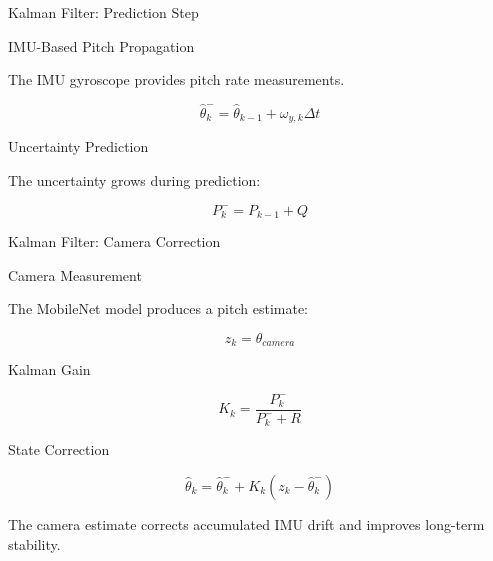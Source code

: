 \documentclass[aspectratio=169,11pt]{beamer}
\begin{document}
\begin{frame}{Kalman Filter: Prediction Step}

\begin{block}{IMU-Based Pitch Propagation}

The IMU gyroscope provides pitch rate measurements.

\[
\hat{\theta}_k^{-}
=
\hat{\theta}_{k-1}
+
\omega_{y,k}\Delta t
\]

\end{block}

\vspace{0.3cm}

\begin{block}{Uncertainty Prediction}

The uncertainty grows during prediction:

\[
P_k^{-}
=
P_{k-1}
+
Q
\]

\end{block}

\end{frame}

\begin{frame}{Kalman Filter: Camera Correction}

\begin{block}{Camera Measurement}

The MobileNet model produces a pitch estimate:

\[
z_k
=
\theta_{camera}
\]

\end{block}

\vspace{0.3cm}

\begin{block}{Kalman Gain}

\[
K_k
=
\frac{P_k^{-}}
     {P_k^{-}+R}
\]

\end{block}

\vspace{0.3cm}

\begin{block}{State Correction}

\[
\hat{\theta}_k
=
\hat{\theta}_k^{-}
+
K_k
\left(
z_k-\hat{\theta}_k^{-}
\right)
\]

\end{block}



\small
The camera estimate corrects accumulated IMU drift and improves long-term stability.

\end{frame}
\end{document}
